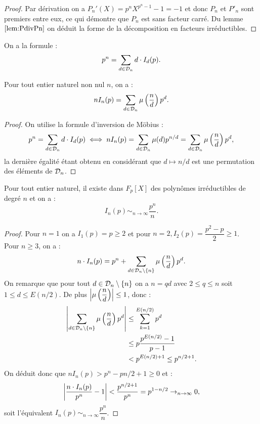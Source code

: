 \begin{proof}
Par dérivation on a $P_n'(X) = p^n X^{p^n-1} - 1 = -1$ et donc $P_n$ et $P'_n$ sont premiers entre eux, ce qui démontre que $P_n$
est sans facteur carré. Du lemme $\ref{lem:PdivPn}$ on déduit la forme de la décomposition en facteurs irréductibles.
\end{proof}

\begin{coro}
On a la formule :
\[ p^n = \sum_{d \in \D_n} d \cdot I_d(p) . \]
\end{coro}

\begin{thm}
Pour tout entier naturel non nul $n$, on a :
\[ n I_n(p) = \sum_{d \in \D_n} \mu \left ( \dfrac{n}{d} \right ) p^d . \]
\end{thm}

\begin{proof}
On utilise la formule d'inversion de Möbius :
\[ p^n = \sum_{d \in \D_n} d \cdot I_d(p) \iff n I_n(p) = \sum_{d \in \D_n} \mu(d) p^{n/d} 
	= \sum_{d \in \D_n} \mu \left ( \dfrac{n}{d} \right ) p^d , \]
la dernière égalité étant obtenu en considérant que $d \mapsto n/d$ est une permutation des éléments de $\D_n$.
\end{proof}

\begin{coro}
Pour tout entier naturel, il existe dans $F_p[X]$ des polynômes irréductibles de degré $n$ et on a :
\[ I_n(p) \sim_{n \to \infty} \dfrac{p^n}{n} . \]
\end{coro}

\begin{proof}
Pour $n=1$ on a $I_1(p) = p \geq 2$ et
pour $n=2, I_2(p) = \dfrac{p^2 - p}{2} \geq 1$. \\
Pour $n \geq 3$, on a :
\[ n \cdot I_n(p) = p^n + \sum_{d \in \D_n \setminus \set{n}} \mu \left ( \dfrac{n}{d} \right ) p^d . \]
On remarque que pour tout $d \in \D_n \setminus \set{n}$ on a $n=qd$ avec $2 \leq q \leq n$ soit $1 \leq d \leq E(n/2)$.
De plus $\abs*{\mu \left ( \dfrac{n}{d} \right )} \leq 1$, donc :
\begin{align*}
\abs*{\sum_{d \in \D_n \setminus \set{n}} \mu \left ( \dfrac{n}{d} \right ) p^d} & \leq \sum_{k=1}^{E(n/2)} p^d \\
& \leq p \dfrac{p^{E(n/2)} - 1}{p-1} \\
& < p^{E(n/2)+1} \leq p^{n/2+1} .
\end{align*}
On déduit donc que $n I_n(p) > p^n - p{n/2+1} \geq 0$ et :
\[ \abs*{\dfrac{n \cdot I_n(p)}{p^n} - 1} < \dfrac{p^{n/2+1}}{p^n} = p^{1-n/2} \to_{n \to \infty} 0 , \]
soit l'équivalent $I_n(p) \sim_{n \to \infty} \dfrac{p^n}{n}$.
\end{proof}

